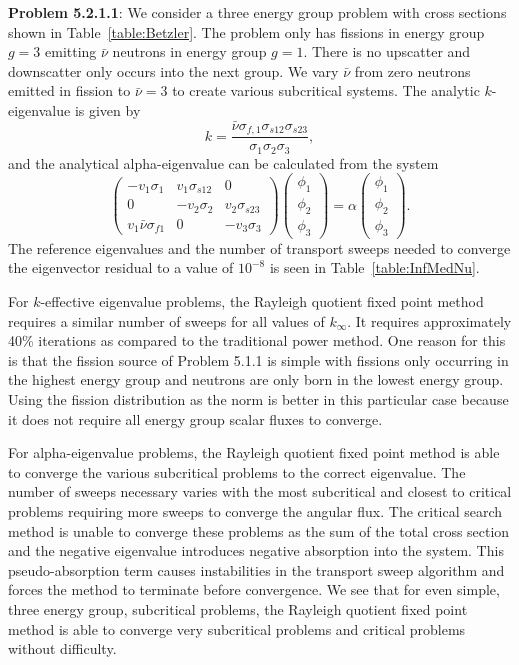 \textbf{Problem 5.2.1.1}: We consider a three energy group problem with cross sections shown in Table~\ref{table:Betzler}. The problem only has fissions in energy group $g = 3$ emitting $\bar{\nu}$ neutrons in energy group $g = 1$. There is no upscatter and downscatter only occurs into the next group. We vary $\bar{\nu}$ from zero neutrons emitted in fission to $\bar{\nu} = 3$ to create various subcritical systems. The analytic $k$-eigenvalue is given by
\begin{equation}
	k = \frac{\bar{\nu} \sigma_{f,1} \sigma_{s12} \sigma_{s23}}{\sigma_{1} \sigma_{2} \sigma_{3}},
\end{equation}
and the analytical alpha-eigenvalue can be calculated from the system
\begin{equation}
	\begin{pmatrix}
		-v_{1} \sigma_{1} & v_{1} \sigma_{s12} & 0 \\
		0 & -v_{2} \sigma_{2} & v_{2} \sigma_{s23} \\
		v_{1} \bar{\nu} \sigma_{f1} & 0 & -v_{3} \sigma_{3}
	\end{pmatrix}
	\begin{pmatrix}
		\phi_{1} \\ \phi_{2} \\ \phi_{3}
	\end{pmatrix} = 
	\alpha
	\begin{pmatrix}
		\phi_{1} \\ \phi_{2} \\ \phi_{3}
	\end{pmatrix}.
\end{equation}
The reference eigenvalues and the number of transport sweeps needed to converge the eigenvector residual to a value of $10^{-8}$ is seen in Table~\ref{table:InfMedNu}. 

For $k$-effective eigenvalue problems, the Rayleigh quotient fixed point method requires a similar number of sweeps for all values of $k_{\infty}$. It requires approximately 40\% iterations as compared to the traditional power method. One reason for this is that the fission source of Problem 5.1.1 is simple with fissions only occurring in the highest energy group and neutrons are only born in the lowest energy group. Using the fission distribution as the norm is better in this particular case because it does not require all energy group scalar fluxes to converge.

For alpha-eigenvalue problems, the Rayleigh quotient fixed point method is able to converge the various subcritical problems to the correct eigenvalue. The number of sweeps necessary varies with the most subcritical and closest to critical problems requiring more sweeps to converge the angular flux. The critical search method is unable to converge these problems as the sum of the total cross section and the negative eigenvalue introduces negative absorption into the system. This pseudo-absorption term causes instabilities in the transport sweep algorithm and forces the method to terminate before convergence. We see that for even simple, three energy group, subcritical problems, the Rayleigh quotient fixed point method is able to converge very subcritical problems and critical problems without difficulty.

